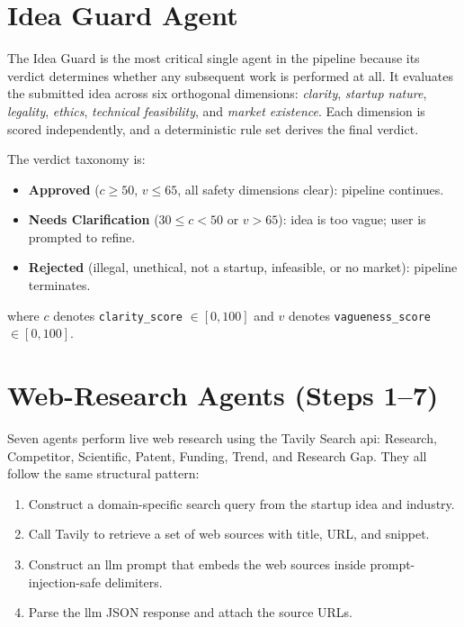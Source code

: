 \documentclass[12pt,a4paper,oneside]{book}
\begin{document}
\section{Idea Guard Agent}

The Idea Guard is the most critical single agent in the pipeline because its verdict determines whether any subsequent work is performed at all. It evaluates the submitted idea across six orthogonal dimensions: \emph{clarity}, \emph{startup nature}, \emph{legality}, \emph{ethics}, \emph{technical feasibility}, and \emph{market existence}. Each dimension is scored independently, and a deterministic rule set derives the final verdict.

The verdict taxonomy is:

\begin{itemize}
  \item \textbf{Approved} ($c \geq 50$, $v \leq 65$, all safety dimensions clear): pipeline continues.
  \item \textbf{Needs Clarification} ($30 \leq c < 50$ or $v > 65$): idea is too vague; user is prompted to refine.
  \item \textbf{Rejected} (illegal, unethical, not a startup, infeasible, or no market): pipeline terminates.
\end{itemize}

where $c$ denotes \texttt{clarity\_score} $\in [0, 100]$ and $v$ denotes \texttt{vagueness\_score} $\in [0, 100]$.

\section{Web-Research Agents (Steps 1–7)}

Seven agents perform live web research using the Tavily Search \gls{api}: Research, Competitor, Scientific, Patent, Funding, Trend, and Research Gap. They all follow the same structural pattern:

\begin{enumerate}
  \item Construct a domain-specific search query from the startup idea and industry.
  \item Call Tavily to retrieve a set of web sources with title, URL, and snippet.
  \item Construct an \gls{llm} prompt that embeds the web sources inside prompt-injection-safe delimiters.
  \item Parse the \gls{llm} JSON response and attach the source URLs.
\end{enumerate}
\end{document}
